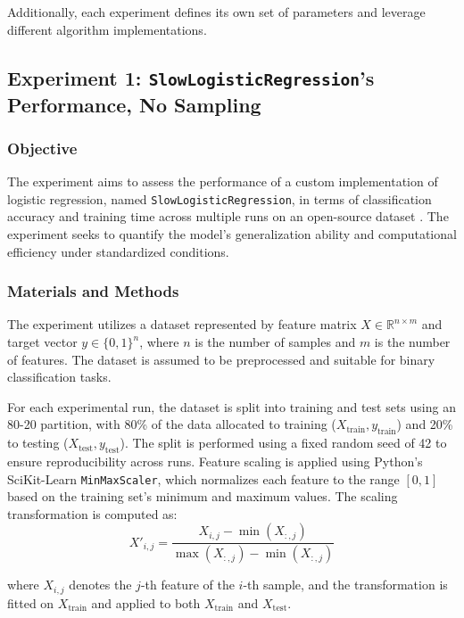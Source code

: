 \documentclass{article}
\theoremstyle{plain}
\theoremstyle{definition}
\theoremstyle{remark}
\begin{document}
Additionally, each experiment defines its own set of parameters and leverage different algorithm implementations.

\subsection{Experiment 1: \texttt{SlowLogisticRegression}'s Performance, No Sampling}


\subsubsection{Objective}

The experiment aims to assess the performance of a custom implementation of logistic regression, named \texttt{SlowLogisticRegression}, in terms of classification accuracy and training time across multiple runs on an open-source dataset \cite{breastcancer}. The experiment seeks to quantify the model's generalization ability and computational efficiency under standardized conditions.


\subsubsection{Materials and Methods}

The experiment utilizes a dataset represented by feature matrix $ X \in \mathbb{R}^{n \times m} $ and target vector $ y \in \{0, 1\}^n $, where $ n $ is the number of samples and $ m $ is the number of features. The dataset is assumed to be preprocessed and suitable for binary classification tasks.

For each experimental run, the dataset is split into training and test sets using an 80-20 partition, with 80\% of the data allocated to training ($ X_{\text{train}}, y_{\text{train}} $) and 20\% to testing ($ X_{\text{test}}, y_{\text{test}} $). The split is performed using a fixed random seed of 42 to ensure reproducibility across runs. Feature scaling is applied using Python's SciKit-Learn \texttt{MinMaxScaler}, which normalizes each feature to the range $[0, 1]$ based on the training set's minimum and maximum values. The scaling transformation is computed as:
$$
X'_{i,j} = \frac{X_{i,j} - \min(X_{:,j})}{\max(X_{:,j}) - \min(X_{:,j})}
$$

where $ X_{i,j} $ denotes the $ j $-th feature of the $ i $-th sample, and the transformation is fitted on $ X_{\text{train}} $ and applied to both $ X_{\text{train}} $ and $ X_{\text{test}} $.
\end{document}
